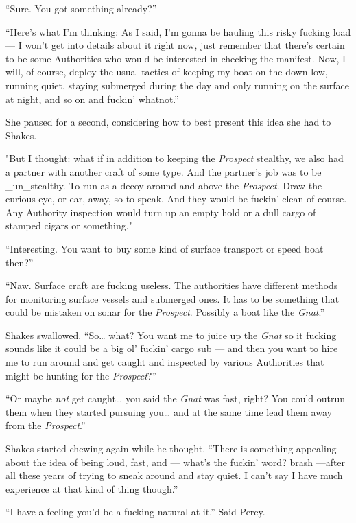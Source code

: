 \documentclass[]{scrbook}
\begin{document}
``Sure. You got something already?''

``Here's what I'm thinking: As I said, I'm gonna be hauling this risky
fucking load --- I won't get into details about it right now, just
remember that there's certain to be some Authorities who would be
interested in checking the manifest. Now, I will, of course, deploy the
usual tactics of keeping my boat on the down-low, running quiet, staying
submerged during the day and only running on the surface at night, and
so on and fuckin' whatnot.''

She paused for a second, considering how to best present this idea she
had to Shakes.

"But I thought: what if in addition to keeping the \emph{Prospect}
stealthy, we also had a partner with another craft of some type. And the
partner's job was to be \_un\_stealthy. To run as a decoy around and
above the \emph{Prospect}. Draw the curious eye, or ear, away, so to
speak. And they would be fuckin' clean of course. Any Authority
inspection would turn up an empty hold or a dull cargo of stamped cigars
or something."

``Interesting. You want to buy some kind of surface transport or speed
boat then?''

``Naw. Surface craft are fucking useless. The authorities have different
methods for monitoring surface vessels and submerged ones. It has to be
something that could be mistaken on sonar for the \emph{Prospect}.
Possibly a boat like the \emph{Gnat}.''

Shakes swallowed. ``So\ldots{} what? You want me to juice up the
\emph{Gnat} so it fucking sounds like it could be a big ol' fuckin'
cargo sub --- and then you want to hire me to run around and get caught
and inspected by various Authorities that might be hunting for the
\emph{Prospect}?''

``Or maybe \emph{not} get caught\ldots{} you said the \emph{Gnat} was
fast, right? You could outrun them when they started pursuing
you\ldots{} and at the same time lead them away from the
\emph{Prospect}.''

Shakes started chewing again while he thought. ``There is something
appealing about the idea of being loud, fast, and --- what's the fuckin'
word? brash ---after all these years of trying to sneak around and stay
quiet. I can't say I have much experience at that kind of thing
though.''

``I have a feeling you'd be a fucking natural at it.'' Said Percy.
\end{document}
